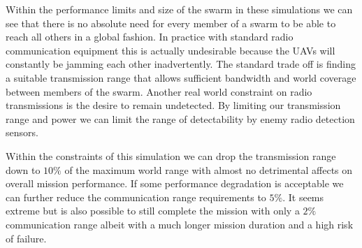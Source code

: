 




Within the performance limits and size of the swarm in these simulations we can see that there is no absolute need for every member of a swarm to be able to reach all others in a global fashion.  In practice with standard radio communication  equipment this is actually undesirable because the UAVs will constantly be jamming each other inadvertently.  The standard trade off is finding a suitable transmission range that allows sufficient bandwidth and world coverage between members of the swarm.  Another real world constraint on radio transmissions is the desire to remain undetected.  By limiting our transmission range and power we can limit the range of detectability by enemy radio detection sensors.

Within the constraints of this simulation we can drop the transmission range down to $10\%$ of the maximum world range with almost no detrimental affects on overall mission performance.  If some performance degradation is acceptable we can further reduce the communication range requirements to $5\%$.  It seems extreme but is also possible to still complete the mission with only a $2\%$ communication range albeit with a much longer mission duration and a high risk of failure.

